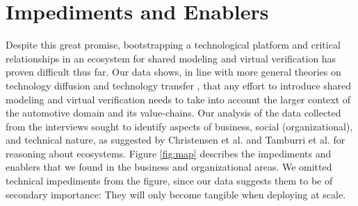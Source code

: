 \section{Impediments and Enablers}\label{sec:impediments_and_enablers}

Despite this great promise, bootstrapping a technological platform and critical relationships in an ecosystem for shared modeling and virtual verification has proven difficult thus far.
Our data shows, in line with more general theories on technology diffusion \cite{rogers2010diffusion} %
and technology transfer \cite{gorschek2006model}, that any effort to introduce shared modeling and virtual verification needs to take into account the larger context of the automotive domain and its value-chains. 
Our analysis of the data collected from the interviews sought to identify aspects of business, social (organizational), and technical nature, as suggested by Christensen et al. \cite{christensen2014analysis} and Tamburri et al. \cite{tamburri2013uncovering} for reasoning about ecosystems. 
Figure \ref{fig:map} describes the impediments and enablers that we found in the business and organizational areas. 
We omitted technical impediments from the figure, since our data suggests them to be of secondary importance:
They will only become tangible when deploying at scale.


